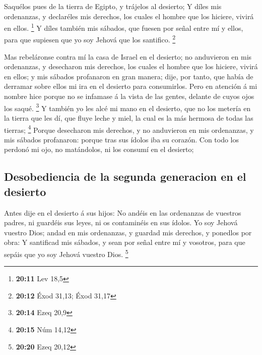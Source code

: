  Saquélos pues de la tierra de Egipto, y trájelos al
desierto;  Y díles mis ordenanzas, y declaréles mis
derechos, los cuales el hombre que los hiciere, vivirá en ellos.
\footnote{\textbf{20:11} Lev 18,5}  Y díles también mis
sábados, que fuesen por señal entre mí y ellos, para que supiesen que yo
soy Jehová que los santifico. \footnote{\textbf{20:12} Éxod 31,13; Éxod
  31,17}

 Mas rebeláronse contra mí la casa de Israel en el
desierto; no anduvieron en mis ordenanzas, y desecharon mis derechos,
los cuales el hombre que los hiciere, vivirá en ellos; y mis sábados
profanaron en gran manera; dije, por tanto, que había de derramar sobre
ellos mi ira en el desierto para consumirlos.  Pero en
atención á mi nombre hice porque no se infamase á la vista de las
gentes, delante de cuyos ojos los saqué. \footnote{\textbf{20:14} Ezeq
  20,9}  Y también yo les alcé mi mano en el desierto,
que no los metería en la tierra que les dí, que fluye leche y miel, la
cual es la más hermosa de todas las tierras; \footnote{\textbf{20:15}
  Núm 14,12}  Porque desecharon mis derechos, y no
anduvieron en mis ordenanzas, y mis sábados profanaron: porque tras sus
ídolos iba su corazón.  Con todo los perdonó mi ojo, no
matándolos, ni los consumí en el desierto;

\hypertarget{desobediencia-de-la-segunda-generacion-en-el-desierto}{%
\subsection{Desobediencia de la segunda generacion en el
desierto}\label{desobediencia-de-la-segunda-generacion-en-el-desierto}}

 Antes dije en el desierto á sus hijos: No andéis en las
ordenanzas de vuestros padres, ni guardéis sus leyes, ni os contaminéis
en sus ídolos.  Yo soy Jehová vuestro Dios; andad en mis
ordenanzas, y guardad mis derechos, y ponedlos por obra: 
Y santificad mis sábados, y sean por señal entre mí y vosotros, para que
sepáis que yo soy Jehová vuestro Dios. \footnote{\textbf{20:20} Ezeq
  20,12}


